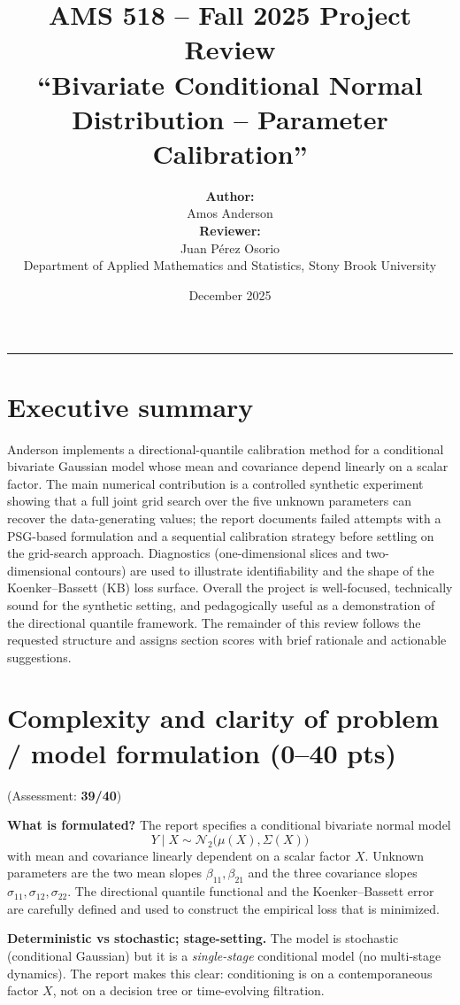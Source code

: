 \documentclass[11pt]{article}
\title{
	\vspace{-2cm}
	\textbf{AMS 518 – Fall 2025 Project Review}\\[0.5em]
	\Large \textbf{``Bivariate Conditional Normal Distribution -- Parameter Calibration''} 
}
\author{
	\textbf{Author:} \\[0.3em]
	Amos Anderson \\[0.3em]
	\textbf{Reviewer:} \\[0.3em]
	Juan Pérez Osorio \\[0.5em]
	Department of Applied Mathematics and Statistics, Stony Brook University
}
\date{December 2025}
\begin{document}
	\maketitle
	\hrule
	\vspace{8pt}
	
	\section*{Executive summary}
	Anderson implements a directional-quantile calibration method for a conditional bivariate Gaussian model whose mean and covariance depend linearly on a scalar factor. The main numerical contribution is a controlled synthetic experiment showing that a full joint grid search over the five unknown parameters can recover the data-generating values; the report documents failed attempts with a PSG-based formulation and a sequential calibration strategy before settling on the grid-search approach. Diagnostics (one-dimensional slices and two-dimensional contours) are used to illustrate identifiability and the shape of the Koenker--Bassett (KB) loss surface. Overall the project is well-focused, technically sound for the synthetic setting, and pedagogically useful as a demonstration of the directional quantile framework. The remainder of this review follows the requested structure and assigns section scores with brief rationale and actionable suggestions.
	
	\section{Complexity and clarity of problem / model formulation (0--40 pts)}
		
	(Assessment: \textbf{39/40})
	
	\textbf{What is formulated?} The report specifies a conditional bivariate normal model
	\[
	Y\mid X \sim \mathcal{N}_2\big(\mu(X),\Sigma(X)\big)
	\]
	with mean and covariance linearly dependent on a scalar factor \(X\). Unknown parameters are the two mean slopes \(\beta_{11},\beta_{21}\) and the three covariance slopes \(\sigma_{11},\sigma_{12},\sigma_{22}\). The directional quantile functional and the Koenker--Bassett error are carefully defined and used to construct the empirical loss that is minimized.
	
	\textbf{Deterministic vs stochastic; stage-setting.} The model is stochastic (conditional Gaussian) but it is a \emph{single-stage} conditional model (no multi-stage dynamics). The report makes this clear: conditioning is on a contemporaneous factor \(X\), not on a decision tree or time-evolving filtration. 
	
\end{document}
